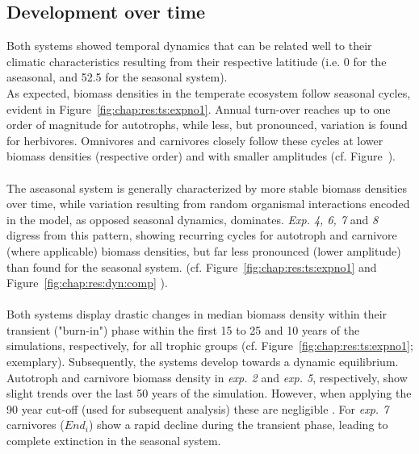 \subsection{Development over time}
\label{chap:res:dyn:temporal}
Both systems showed temporal dynamics that can be related well to their climatic characteristics resulting from their respective latitiude (i.e. 0 for the aseasonal, and 52.5 for the seasonal system).\\
As expected, biomass densities in the temperate ecosystem follow seasonal cycles, evident in Figure~\ref{fig:chap:res:ts:expno1}.
 Annual turn-over reaches up to one order of magnitude for autotrophs, while less, but pronounced, variation is found for herbivores.
  Omnivores and carnivores closely follow these cycles  at lower biomass densities (respective order) and with smaller amplitudes (cf. Figure~). \\\\
  The aseasonal system is generally characterized by more stable biomass densities over time, while variation resulting from random organismal interactions encoded in the model, as opposed seasonal dynamics, dominates. 
  \textit{Exp. 4, 6, 7} and \textit{8} digress from this pattern, showing recurring cycles for autotroph and carnivore (where applicable) biomass densities, but far less  pronounced (lower amplitude) than found for the seasonal system. 
(cf. Figure~\ref{fig:chap:res:ts:expno1} and Figure~\ref{fig:chap:res:dyn:comp}
 ).\\\\
Both systems display drastic changes in median biomass density within their transient ("burn-in") phase within the first 15 to 25 and 10 years of the simulations, respectively, for all trophic groups (cf. Figure~\ref{fig:chap:res:ts:expno1}; exemplary). 
Subsequently, the systems develop towards a dynamic equilibrium. 
Autotroph and carnivore  biomass density in \textit{exp. 2} and \textit{exp. 5}, respectively, show slight trends over the last 50 years of the simulation. 
However, when applying the 90 year cut-off (used for subsequent analysis) these are negligible . For \textit{exp. 7} carnivores ($End_i$) show a rapid decline during the transient phase, leading to complete extinction in the seasonal system.
